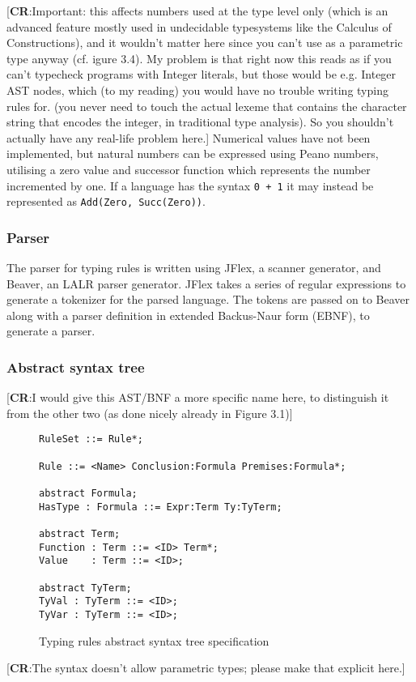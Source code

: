 \documentclass[nofilelist]{cslthse-msc}
\newcommand{\CR}[1]{\textcolor{green!60!black}{[\textbf{CR}:#1]}}
\begin{document}
\CR{Important: this affects numbers used at the type level only (which is an advanced feature mostly used in undecidable
  typesystems like the Calculus of Constructions), and it wouldn't matter here since you can't use \ty{Succ} as a parametric
  type anyway (cf. igure 3.4).
  My problem is that right now this reads as if you can't typecheck programs with Integer literals,
  but those would be e.g. \textsf{Integer} AST nodes, which (to my reading) you would have no trouble writing typing rules for.
  (you never need to touch the actual lexeme that contains the character string that encodes the integer, in traditional
  type analysis).  So you shouldn't actually have any real-life problem here.}
Numerical values have not been implemented, but natural numbers can be expressed using Peano numbers\cite{peano}, utilising a zero value and successor function which represents the number incremented by one.
If a language has the syntax \verb|0 + 1| it may instead be represented as \verb|Add(Zero, Succ(Zero))|.


\subsubsection{Parser}\label{typingrulesparser}
The parser for typing rules is written using JFlex\cite{jflex}, a scanner generator, and Beaver\cite{beaver}, an LALR parser generator.
JFlex takes a series of regular expressions to generate a tokenizer for the parsed language.
The tokens are passed on to Beaver along with a parser definition in extended Backus-Naur form (EBNF), to generate a parser.


\subsubsection{Abstract syntax tree}\label{typingrulesast}
\CR{I would give this AST/BNF a more specific name here, to distinguish it from the other two (as done nicely already in Figure 3.1)}
\begin{figure}[h]
\begin{lstlisting}[]
RuleSet ::= Rule*;

Rule ::= <Name> Conclusion:Formula Premises:Formula*;

abstract Formula;
HasType : Formula ::= Expr:Term Ty:TyTerm;

abstract Term;
Function : Term ::= <ID> Term*;
Value    : Term ::= <ID>;

abstract TyTerm;
TyVal : TyTerm ::= <ID>;
TyVar : TyTerm ::= <ID>;
\end{lstlisting}
  \caption{Typing rules abstract syntax tree specification}
  \label{trastspec}
\end{figure}
\CR{The syntax doesn't allow parametric types; please make that explicit here.}
\end{document}
